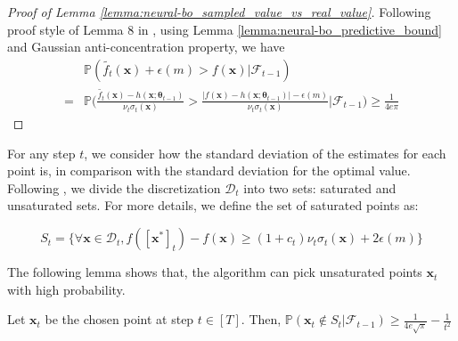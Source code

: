 \begin{proof}[Proof of Lemma \ref{lemma:neural-bo_sampled_value_vs_real_value}]
Following proof style of Lemma 8 in \citet{zhou2020neural}, using Lemma \ref{lemma:neural-bo_predictive_bound} and Gaussian anti-concentration property, we have 
\begin{align*}
        & \mathbb{P}(\widetilde{f_t}(\mathbf{x}) + \epsilon(m) > f(\mathbf{x}) \lvert \mathcal{F}_{t-1}) \\
        = & \mathbb{P} \Bigg(\frac{\widetilde{f_t}(\mathbf{x}) - h(\mathbf{x}; \boldsymbol{\theta}_{t-1}) }{\nu_t \sigma_t(\mathbf{x})} >   \frac{ \lvert f(\mathbf{x}) - h(\mathbf{x}; \boldsymbol{\theta}_{t-1}) \rvert - \epsilon(m) }{\nu_t \sigma_t(\mathbf{x})}  \Bigg \lvert \mathcal{F}_{t-1} \Bigg) \geq \frac{1}{4e\pi}
\end{align*}
\end{proof}




For any step $t$, we consider how the standard deviation of the estimates for each point is, in comparison with the standard deviation for the optimal value.
Following \citet{zhang2021neural}, we divide the discretization $\mathcal D_t$ into two sets: saturated and unsaturated sets. For more details, we define the set of saturated points as:

\begin{equation}
\label{def:saturated_set}
S_t = \{\forall \mathbf{x} \in \mathcal{D}_t, f([\mathbf{x}^*]_t) - f(\mathbf{x}) \geq (1+c_t)\nu_t \sigma_t(\mathbf{x})+ 2\epsilon(m)\}
\end{equation}




The following lemma shows that, the algorithm can pick unsaturated points $\mathbf{x}_t$ with high probability. 
\begin{lemma}
\label{lemma:unsaturated_points}

Let $\mathbf{x}_t$ be the chosen point at step $t \in [T]$. Then, $\mathbb{P}(\mathbf{x}_t \not\in S_t \lvert \mathcal{F}_{t-1}) \geq \frac{1}{4e\sqrt{\pi}} - \frac{1}{t^2}$
\end{lemma}

